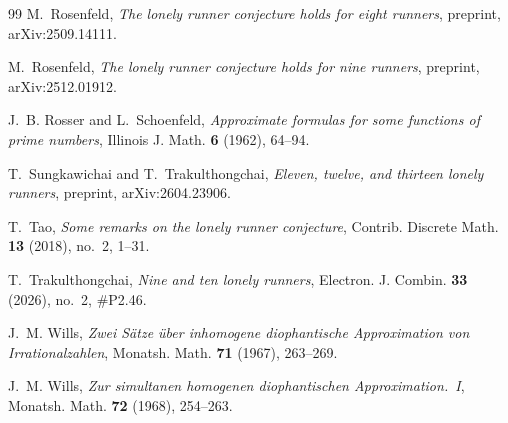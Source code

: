 \documentclass[11pt]{article}
\theoremstyle{definition}
\begin{document}
\begin{thebibliography}{99}
M.~Rosenfeld, \emph{The lonely runner conjecture holds for eight
runners}, preprint, arXiv:2509.14111.

M.~Rosenfeld, \emph{The lonely runner conjecture holds for nine
runners}, preprint, arXiv:2512.01912.

J.~B. Rosser and L.~Schoenfeld, \emph{Approximate formulas for some
functions of prime numbers}, Illinois J. Math. \textbf{6} (1962),
64--94.

T.~Sungkawichai and T.~Trakulthongchai, \emph{Eleven, twelve, and
thirteen lonely runners}, preprint, arXiv:2604.23906.

T.~Tao, \emph{Some remarks on the lonely runner conjecture}, Contrib.
Discrete Math. \textbf{13} (2018), no.~2, 1--31.

T.~Trakulthongchai, \emph{Nine and ten lonely runners}, Electron. J.
Combin. \textbf{33} (2026), no.~2, \#P2.46.

J.~M. Wills, \emph{Zwei S\"atze \"uber inhomogene diophantische
Approximation von Irrationalzahlen}, Monatsh. Math. \textbf{71} (1967),
263--269.

J.~M. Wills, \emph{Zur simultanen homogenen diophantischen
Approximation.~I}, Monatsh. Math. \textbf{72} (1968), 254--263.

\end{thebibliography}
\end{document}
